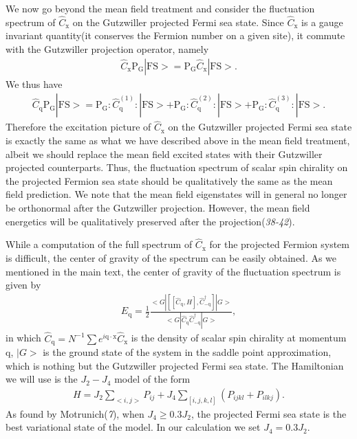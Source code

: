 \documentclass[12pt]{article}
\begin{document}
We now go beyond the mean field treatment and consider the fluctuation spectrum of $\hat{C}_{\mathrm{x}}$ on the Gutzwiller projected Fermi sea state. Since $\hat{C}_{\mathrm{x}}$ is a gauge invariant quantity(it conserves the Fermion number on a given site), it commute with the Gutzwiller projection operator, namely
\begin{eqnarray}
\hat{C}_{\mathrm{x}}\mathrm{P_{G}}|\mathrm{FS}>=\mathrm{P_{G}}\hat{C}_{\mathrm{x}}|\mathrm{FS}>.\nonumber
\end{eqnarray}
We thus have
\begin{eqnarray}
\hat{C}_{\mathrm{q}}\mathrm{P_{G}}|\mathrm{FS}>=\mathrm{P_{G}} :\hat{C}^{(1)}_{\mathrm{q}}:|\mathrm{FS}>+\mathrm{P_{G}}:\hat{C}^{(2)}_{\mathrm{q}}:|\mathrm{FS}>+\mathrm{P_{G}}:\hat{C}^{(3)}_{\mathrm{q}}:|\mathrm{FS}>.\nonumber
\end{eqnarray}
Therefore the excitation picture of $\hat{C}_{\mathrm{x}}$ on the Gutzwiller projected Fermi sea state is exactly the same as what we have described above  in the mean field treatment, albeit we should replace the mean field excited states with their Gutzwiller projected counterparts. Thus, the fluctuation spectrum of scalar spin chirality on the projected Fermion sea state should be qualitatively the same as the mean field prediction. We note that the mean field eigenstates will in general no longer be orthonormal after the Gutzwiller projection. However, the mean field energetics will be qualitatively preserved after the projection({\it 38-42\/}).


While a computation of the full spectrum of $\hat{C}_{\mathrm{x}}$ for the projected Fermion system is difficult, the center of gravity of the spectrum can be easily obtained. As we mentioned in the main text, the center of gravity of the fluctuation spectrum is given by
\begin{eqnarray}
E_{\mathrm{q}} =\frac{1}{2}\frac{<G|[[\hat{C}_{\mathrm{q}},H],\hat{C}_{-\mathrm{q}}^{\dagger}]|G>}{<G|\hat{C}_{\mathrm{q}}\hat{C}_{-\mathrm{q}}^{\dagger}|G>},
\end{eqnarray}
in which $\hat{C}_{\mathrm{q}}=N^{-1}\sum e^{i\mathrm{q}\cdot \mathrm{x}}\hat{C}_{\mathrm{x}}$ is the density of scalar spin chirality at momentum $\mathrm{q}$, $|G>$ is the ground state of the system in the saddle point approximation, which is nothing but the Gutzwiller projected Fermi sea state. The Hamiltonian we will use is the $J_{2}-J_{4}$ model of the form
\begin{eqnarray}
H=J_{2}\sum_{<i,j>} P_{ij}+J_{4}\sum_{[i,j,k,l]}(P_{ijkl}+P_{ilkj}).\nonumber
\end{eqnarray}
As found by Motrunich({\it 7\/}), when $J_{4}\geq 0.3J_{2}$, the projected Fermi sea state is the best variational state of the model. In our calculation we set $J_{4}=0.3J_{2}$. 
\end{document}
